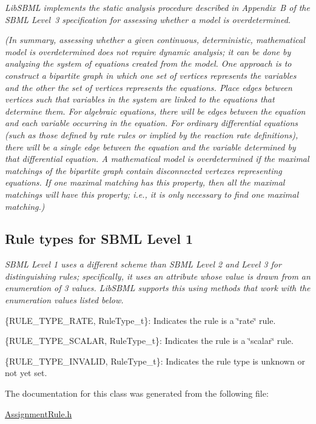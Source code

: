 {\itshape  Lib\+S\+B\+ML implements the static analysis procedure described in Appendix~B of the S\+B\+ML Level~3 specification for assessing whether a model is overdetermined.}

{\itshape  (In summary, assessing whether a given continuous, deterministic, mathematical model is overdetermined does not require dynamic analysis; it can be done by analyzing the system of equations created from the model. One approach is to construct a bipartite graph in which one set of vertices represents the variables and the other the set of vertices represents the equations. Place edges between vertices such that variables in the system are linked to the equations that determine them. For algebraic equations, there will be edges between the equation and each variable occurring in the equation. For ordinary differential equations (such as those defined by rate rules or implied by the reaction rate definitions), there will be a single edge between the equation and the variable determined by that differential equation. A mathematical model is overdetermined if the maximal matchings of the bipartite graph contain disconnected vertexes representing equations. If one maximal matching has this property, then all the maximal matchings will have this property; i.\+e., it is only necessary to find one maximal matching.)}

{\itshape }\hypertarget{classdoc__rules__general__summary_RuleType_t}{}\subsection{Rule types for S\+B\+M\+L Level 1}\label{classdoc__rules__general__summary_RuleType_t}
{\itshape  S\+B\+ML Level 1 uses a different scheme than S\+B\+ML Level 2 and Level 3 for distinguishing rules; specifically, it uses an attribute whose value is drawn from an enumeration of 3 values. Lib\+S\+B\+ML supports this using methods that work with the enumeration values listed below.}

{\itshape  \begin{DoxyItemize}
\item \{R\+U\+L\+E\+\_\+\+T\+Y\+P\+E\+\_\+\+R\+A\+TE, Rule\+Type\+\_\+t\}\+: Indicates the rule is a \char`\"{}rate\char`\"{} rule. \item \{R\+U\+L\+E\+\_\+\+T\+Y\+P\+E\+\_\+\+S\+C\+A\+L\+AR, Rule\+Type\+\_\+t\}\+: Indicates the rule is a \char`\"{}scalar\char`\"{} rule. \item \{R\+U\+L\+E\+\_\+\+T\+Y\+P\+E\+\_\+\+I\+N\+V\+A\+L\+ID, Rule\+Type\+\_\+t\}\+: Indicates the rule type is unknown or not yet set. \end{DoxyItemize}
}

The documentation for this class was generated from the following file\+:\begin{DoxyCompactItemize}
\item 
\hyperlink{_assignment_rule_8h}{Assignment\+Rule.\+h}\end{DoxyCompactItemize}
